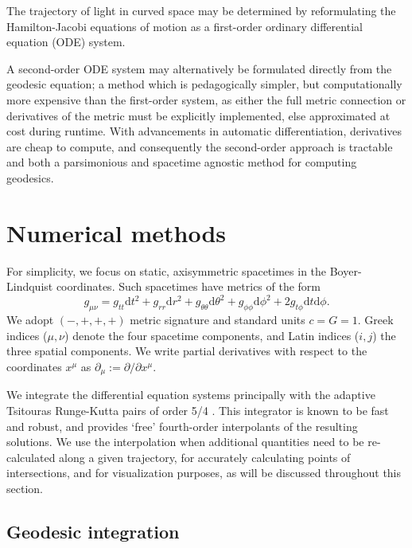 \documentclass[fleqn,usenatbib]{mnras}
\renewcommand{\d}{\text{d}}
\begin{document}
The trajectory of light in curved space may be determined by reformulating the
Hamilton-Jacobi equations of motion as a first-order ordinary differential
equation (ODE) system. 

A second-order ODE system may alternatively be formulated directly from the
geodesic equation; a method which is pedagogically simpler, but computationally
more expensive than the first-order system, as either the full metric
connection or derivatives of the metric must be explicitly implemented, else
approximated at cost during runtime. With advancements in automatic
differentiation, derivatives are cheap to compute, and consequently the
second-order approach is tractable and both a parsimonious and spacetime
agnostic method for computing geodesics.

\section{Numerical methods}

For simplicity, we focus on static, axisymmetric spacetimes in the
Boyer-Lindquist coordinates. Such spacetimes have metrics of the form 
\begin{equation}
\label{eq:static_axisymmetric_metric}
    g_{\mu\nu} 
    = g_{tt} \d t^2 
    + g_{rr} \d r^2 
    + g_{\theta\theta} \d \theta^2 
    + g_{\phi\phi} \d \phi^2 
    + 2g_{t\phi} \d t \d \phi.
\end{equation}
We adopt $(-, +, +, +)$ metric signature and standard units $c = G = 1$. Greek
indices ($\mu, \nu$) denote the four spacetime components, and Latin indices
($i, j$) the three spatial components. We write partial derivatives with
respect to the coordinates $x^\mu$ as $\partial_\mu := \partial / \partial
x^\mu$.

We integrate the differential equation systems principally with the adaptive
Tsitouras Runge-Kutta pairs of order 5/4 \citep{tsitouras_rungekutta_2011}.
This integrator is known to be fast and robust, and provides `free'
fourth-order interpolants of the resulting solutions. We use the interpolation
when additional quantities need to be re-calculated along a given trajectory,
for accurately calculating points of intersections, and for visualization
purposes, as will be discussed throughout this section.

\subsection{Geodesic integration}
\end{document}

